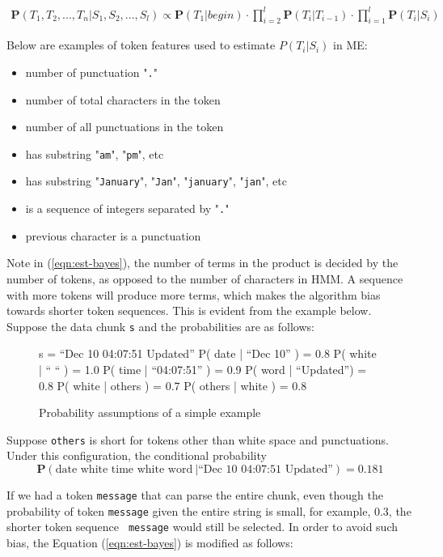 \begin{eqnarray}\label{eqn:est-bayes}
\mathbf{P}(T_1, T_2, ..., T_n|S_1, S_2, ..., S_l) \propto
\mathbf{P}(T_1|begin) \cdot \prod_{i=2}^{l}\mathbf{P}(T_i|T_{i-1})
\cdot \prod_{i=1}^{l}\mathbf{P}(T_i|S_i)
\end{eqnarray}

Below are examples of token features used to estimate
$P(T_i|S_i)$ in ME:

\begin{itemize}
\item number of punctuation "{\tt .}"
\item number of total characters in the token
\item number of all punctuations in the token
\item has substring "{\tt am}", "{\tt pm}", etc
\item has substring "{\tt January}", "{\tt Jan}", "{\tt january}",
"{\tt jan}", etc
\item is a sequence of integers separated by "{\tt .}"
\item previous character is a punctuation
\end{itemize}

Note in (\ref{eqn:est-bayes}), the number of terms in the product is
decided by the number of tokens, as opposed to the number of
characters in HMM. A sequence with more tokens will produce more terms, 
which makes the algorithm bias towards shorter token sequences. 
This is evident from the example below.
Suppose the data chunk {\tt s} and the probabilities are as
follows:

\begin{figure}[t]
\begin{centercode}
s  = ``Dec 10 04:07:51 Updated''
P( date | ``Dec 10'' ) = 0.8
P( white | `` `` ) = 1.0
P( time | ``04:07:51'' ) = 0.9
P( word | ``Updated'') = 0.8
P( white | others ) = 0.7
P( others | white ) = 0.8
\end{centercode}
\caption{Probability assumptions of a simple example}
\end{figure}

Suppose {\tt others} is short for tokens other than white space and
punctuations. Under this configuration, the conditional probability
\[\mathbf{P}(\mbox{date white time white word}~ | \mbox{``Dec 10 04:07:51 Updated''}) = 0.181 \]

If we had a token {\tt message} that can parse the entire chunk,
even though the probability of token {\tt message} given the entire
string is small, for example, 0.3, the shorter token sequence {\tt
message} would still be selected. In order to avoid such bias, the
Equation (\ref{eqn:est-bayes}) is modified as follows:

